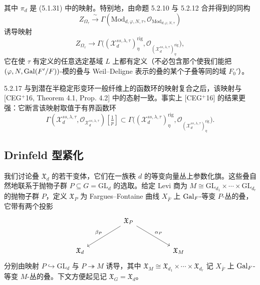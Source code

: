 其中 $\pi_d$ 是 (5.1.31) 中的映射。特别地，由命题 5.2.10 与 5.2.12 合并得到的同构
\begin{equation}\tag{5.2.15}
Z_{\Omega_\tau}\xrightarrow{\ \sim\ }\Gamma(\mathrm{Mod}_{d,\varphi,N,\tau},\mathcal{O}_{\mathrm{Mod}_{d,\varphi,N,\tau}})
\end{equation}
诱导映射
\begin{equation}\tag{5.2.16}
Z_{\Omega_\tau}\longrightarrow\Gamma\bigl((\mathcal{X}^{ss,\lambda,\tau}_d)^{\mathrm{rig}}_\eta,\mathcal{O}_{(\mathcal{X}^{ss,\lambda,\tau}_d)^{\mathrm{rig}}_\eta}\bigr),
\end{equation}
它在使 $\tau$ 有定义的任意选定基域 $L$ 上都有定义（不必包含那个使我们能把 $(\varphi,N,\operatorname{Gal}(F'/F))$-模的叠与 Weil--Deligne 表示的叠的某个子叠等同的域 $F_0'$）。

\begin{rem}{5.2.17}
与到潜在半稳定形变环一般纤维上的函数环的映射复合之后，该映射与 [CEG$^+$16, Theorem 4.1, Prop. 4.2] 中的态射一致。事实上 [CEG$^+$16] 的结果更强：它断言该映射取值于有界函数环
\[
\Gamma(\mathcal{X}^{ss,\lambda,\tau}_d,\mathcal{O}_{\mathcal{X}^{ss,\lambda,\tau}_d})[\tfrac{1}{p}]\subset\Gamma\bigl((\mathcal{X}^{ss,\lambda,\tau}_d)^{\mathrm{rig}}_\eta,\mathcal{O}_{(\mathcal{X}^{ss,\lambda,\tau}_d)^{\mathrm{rig}}_\eta}\bigr).
\]
\label{thm:a4-5-2-17}
\end{rem}

\subsection{Drinfeld 型紧化}

我们讨论叠 $\mathfrak{X}_d$ 的若干变体，它们在一族秩 $d$ 的等变向量丛上参数化旗。这些叠自然地联系于抛物子群 $P\subseteq G=\mathrm{GL}_d$ 的选取。给定 Levi 商为 $M\cong\mathrm{GL}_{d_1}\times\cdots\times\mathrm{GL}_{d_r}$ 的抛物子群 $P$，定义 $\mathfrak{X}_P$ 为 Fargues--Fontaine 曲线 $X_{\bar F}$ 上 $\operatorname{Gal}_F$-等变 $P$-丛的叠，它带有两个投影
\[
\begin{tikzcd}[column sep=huge,row sep=large]
& \mathfrak{X}_P \arrow[dl,"\beta_P"'] \arrow[dr,"\alpha_P"] &\\
\mathfrak{X}_d & & \mathfrak{X}_M
\end{tikzcd}
\]
分别由映射 $P\hookrightarrow\mathrm{GL}_d$ 与 $P\twoheadrightarrow M$ 诱导，其中 $\mathfrak{X}_M\cong\mathfrak{X}_{d_1}\times\cdots\times\mathfrak{X}_{d_r}$ 记 $X_{\bar F}$ 上 $\operatorname{Gal}_F$-等变 $M$-丛的叠。下文方便起见记 $\mathfrak{X}_G=\mathfrak{X}_d$。

